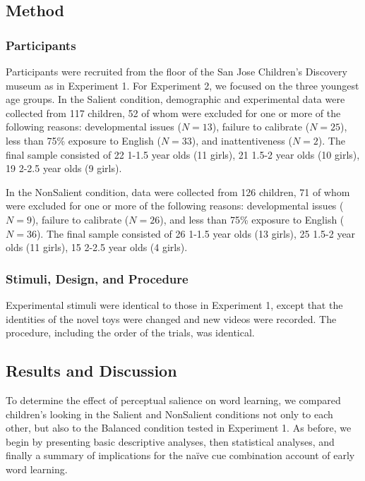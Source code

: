 \documentclass[man,floatsintext]{apa6}
\begin{document}
\subsection{Method}

\subsubsection{Participants}

Participants were recruited from the floor of the San Jose Children's Discovery museum as in Experiment 1. For Experiment 2, we focused on the three youngest age groups. In the Salient condition, demographic and experimental data were collected from 117 children, 52 of whom were excluded for one or more of the following reasons: developmental issues ($N= 13$), failure to calibrate ($N=25$), less than 75\% exposure to English ($N=33$), and inattentiveness ($N=2$). The final sample consisted of 22 1-1.5 year olds (11 girls), 21 1.5-2 year olds (10 girls), 19 2-2.5 year olds (9 girls). 

In the NonSalient condition, data were collected from 126 children, 71 of whom were excluded for one or more of the following reasons: developmental issues ($N= 9$), failure to calibrate ($N=26$), and less than 75\% exposure to English ($N=36$). The final sample consisted of 26 1-1.5 year olds (13 girls), 25 1.5-2 year olds (11 girls), 15 2-2.5 year olds (4 girls).

\subsubsection{Stimuli, Design, and Procedure}

Experimental stimuli were identical to those in Experiment 1, except that the identities of the novel toys were changed and new videos were recorded. The procedure, including the order of the trials, was identical.

\subsection{Results and Discussion}

To determine the effect of perceptual salience on word learning, we compared children's looking in the Salient and NonSalient conditions not only to each other, but also to the Balanced condition tested in Experiment 1. As before, we begin by presenting basic descriptive analyses, then statistical analyses, and finally a summary of implications for the na\"{i}ve cue combination account of early word learning.
\end{document}
